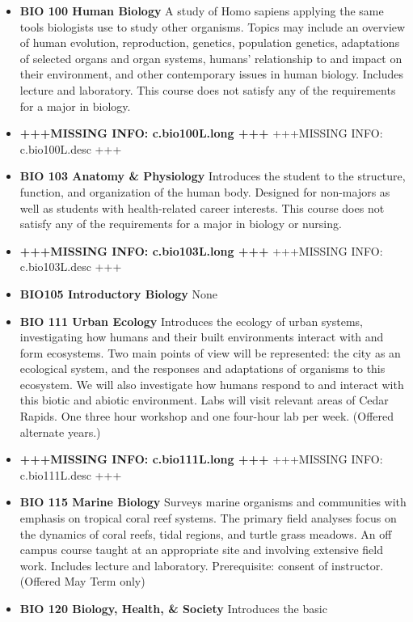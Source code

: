 \documentclass[
  letterpaper,
]{scrbook}
\begin{document}
\begin{itemize}
\item
  \textbf{BIO 100 Human Biology} A study of Homo sapiens applying the
  same tools biologists use to study other organisms. Topics may include
  an overview of human evolution, reproduction, genetics, population
  genetics, adaptations of selected organs and organ systems, humans'
  relationship to and impact on their environment, and other
  contemporary issues in human biology. Includes lecture and laboratory.
  This course does not satisfy any of the requirements for a major in
  biology.
\item
  \textbf{+++MISSING INFO: c.bio100L.long +++} +++MISSING INFO:
  c.bio100L.desc +++
\item
  \textbf{BIO 103 Anatomy \& Physiology} Introduces the student to the
  structure, function, and organization of the human body. Designed for
  non-majors as well as students with health-related career interests.
  This course does not satisfy any of the requirements for a major in
  biology or nursing.
\item
  \textbf{+++MISSING INFO: c.bio103L.long +++} +++MISSING INFO:
  c.bio103L.desc +++
\item
  \textbf{BIO105 Introductory Biology} None
\item
  \textbf{BIO 111 Urban Ecology} Introduces the ecology of urban
  systems, investigating how humans and their built environments
  interact with and form ecosystems. Two main points of view will be
  represented: the city as an ecological system, and the responses and
  adaptations of organisms to this ecosystem. We will also investigate
  how humans respond to and interact with this biotic and abiotic
  environment. Labs will visit relevant areas of Cedar Rapids. One three
  hour workshop and one four-hour lab per week. (Offered alternate
  years.)
\item
  \textbf{+++MISSING INFO: c.bio111L.long +++} +++MISSING INFO:
  c.bio111L.desc +++
\item
  \textbf{BIO 115 Marine Biology} Surveys marine organisms and
  communities with emphasis on tropical coral reef systems. The primary
  field analyses focus on the dynamics of coral reefs, tidal regions,
  and turtle grass meadows. An off campus course taught at an
  appropriate site and involving extensive field work. Includes lecture
  and laboratory. Prerequisite: consent of instructor. (Offered May Term
  only)
\item
  \textbf{BIO 120 Biology, Health, \& Society} Introduces the basic

\end{itemize}
\end{document}

